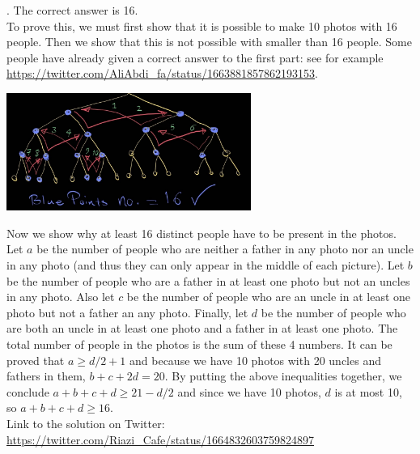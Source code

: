 \begin{solution}.
The correct answer is 16. \\[0.2cm]

To prove this, we must first show that it is possible to make 10 photos with 16 people. Then we show that this is not possible with smaller than 16 people. Some people have already given a correct answer to the first part: see for example \url{https://twitter.com/AliAbdi_fa/status/1663881857862193153}.



\begin{center}
	\includegraphics[width=8cm]{2/figs/sol.jpeg}
\end{center}	

Now we show why at least 16 distinct people have to be present in the photos. Let $a$ be the number of people who are neither a father in any photo nor an uncle in any photo (and thus they can only appear in the middle of each picture). Let $b$ be the number of people who are a father in at least one photo but not an uncles in any photo. Also let $c$ be the number of people who are an uncle in at least one photo but not a father an any photo. Finally, let $d$ be the number of people who are both an uncle in at least one photo and a father in at least one  photo. The total number of people in the photos is the sum of these 4 numbers. It can be proved that $a \geq d/2 + 1$ and because we have 10 photos with 20 uncles and fathers in them, $b + c + 2d = 20$. By putting the above inequalities together, we conclude $a + b + c + d \geq 21 - d/2$ and since we have 10 photos, $d$ is at most 10, so $a + b + c + d \geq 16$.\\[0.2cm]

Link to the solution on Twitter: \url{https://twitter.com/Riazi_Cafe/status/1664832603759824897}

\end{solution}